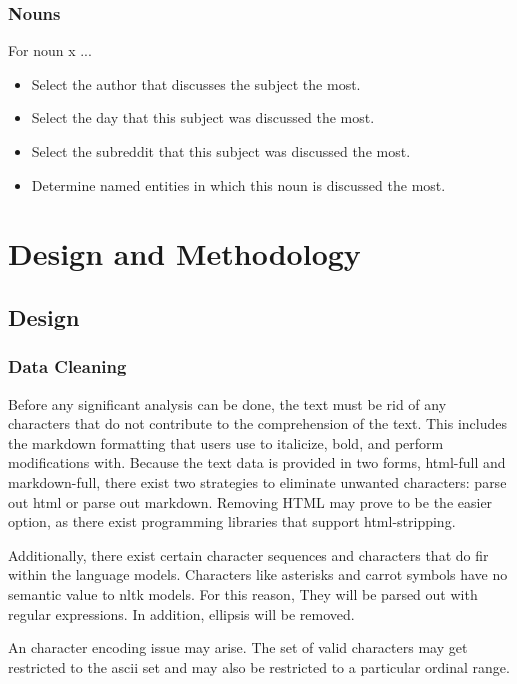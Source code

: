 \documentclass[12pt,a4paper]{article}
\begin{document}
\subsubsection{Nouns}

For noun x ...
\begin{itemize}
	\item Select the author that discusses the subject the most.
	\item Select the day that this subject was discussed the most.
	\item Select the subreddit that this subject was discussed the most.
	\item Determine named entities in which this noun is discussed the most.
\end{itemize}

\section{Design and Methodology}

\subsection{Design}

\subsubsection{Data Cleaning}

Before any significant analysis can be done, the text must be rid of
any characters that do not contribute to the comprehension of the text.
This includes the markdown formatting that users use to italicize, bold,
and perform modifications with. Because the text data is provided in two
forms, html-full and markdown-full, there exist two strategies to eliminate
unwanted characters: parse out html or parse out markdown. Removing HTML
may prove to be the easier option, as there exist programming libraries
that support html-stripping. 

Additionally, there exist certain character sequences and characters that
do fir within the language models. Characters like asterisks and carrot
symbols have no semantic value to nltk models. For this reason,
They will be parsed out with regular expressions. In addition,
ellipsis will be removed.

An character encoding issue may arise. The set of valid characters
may get restricted to the ascii set and may also be restricted to
a particular ordinal range.
\end{document}
